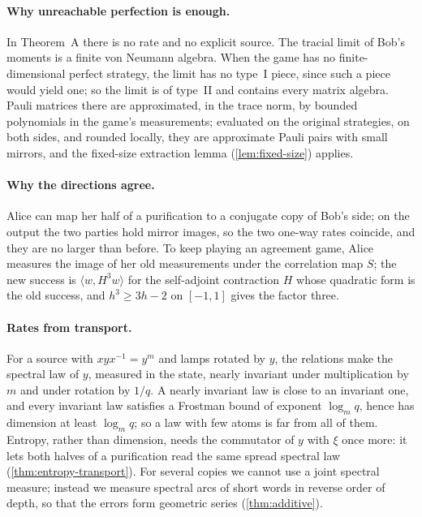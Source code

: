\paragraph{Why unreachable perfection is enough.} In Theorem~A there is no rate and no explicit source. The tracial limit of Bob's
moments is a finite von Neumann algebra. When the game has no finite-dimensional perfect strategy, the limit has no type~I piece,
since such a piece would yield one; so the limit is of type~II and contains every matrix algebra. Pauli matrices there are
approximated, in the trace norm, by bounded polynomials in the game's measurements; evaluated on the original strategies, on both sides, and rounded locally, they are
approximate Pauli pairs with small mirrors, and the fixed-size extraction lemma (\cref{lem:fixed-size}) applies.

\paragraph{Why the directions agree.} Alice can map her half of a purification to a conjugate copy of Bob's side; on the output the
two parties hold mirror images, so the two one-way rates coincide, and they are no larger than before. To keep playing an
agreement game, Alice measures the image of her old measurements under the correlation map $S$; the new success is $\langle w,H^3w\rangle$ for the
self-adjoint contraction $H$ whose quadratic form is the old success, and $h^3\ge3h-2$ on $[-1,1]$ gives the factor three.

\paragraph{Rates from transport.} For a source with $xyx^{-1}=y^m$ and lamps rotated by $y$, the relations make the spectral law of $y$,
measured in the state, nearly invariant under multiplication by $m$ and under rotation by $1/q$. A nearly invariant law is close to an
invariant one, and every invariant law satisfies a Frostman bound of exponent $\log_mq$, hence has dimension at least $\log_mq$;
so a law with few atoms is far from all of them. Entropy, rather than
dimension, needs the commutator of $y$ with $\xi$ once more: it lets both halves of a purification read the same spread spectral
law (\cref{thm:entropy-transport}). For several copies we cannot use a joint spectral measure; instead we measure spectral arcs of
short words in reverse order of depth, so that the errors form geometric series (\cref{thm:additive}).

